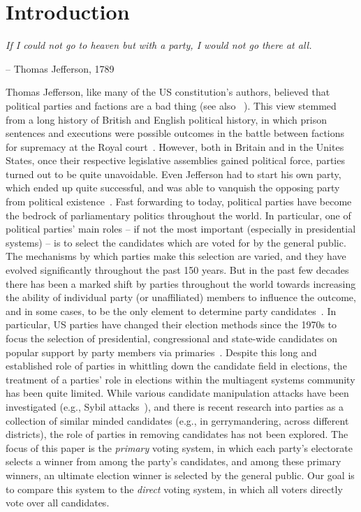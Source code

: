 \documentclass[letterpaper]{article} %
\newcommand{\citet}[1]{\citeauthor{#1}~\shortcite{#1}}
\theoremstyle{definition}
\begin{document}
\section{Introduction}
\epigraph{\emph{If I could not go to heaven but with a party, I would not go there at all.}}{-- Thomas Jefferson, 1789}
Thomas Jefferson, like many of the US constitution's authors, believed that political parties and factions are a bad thing (see also \citet{HMJ87}). This view stemmed from a long history of British and English political history, in which prison sentences and executions were possible outcomes in the battle between factions for supremacy at the Royal court~\cite{Sim07}. However, both in Britain and in the Unites States, once their respective legislative assemblies gained political force, parties turned out to be quite unavoidable. Even Jefferson had to start his own party, which ended up quite successful, and was able to vanquish the opposing party from political existence~\cite{Wil05}.
Fast forwarding to today, political parties have become the bedrock of parliamentary politics throughout the world. In particular, one of political parties' main roles -- if not the most important (especially in presidential systems) -- is to select the candidates which are voted for by the general public. The mechanisms by which parties make this selection are varied, and they have evolved significantly throughout the past 150 years. But in the past few decades there has been a marked shift by parties throughout the world towards increasing the ability of individual party (or unaffiliated) members to influence the outcome, and in some cases, to be the only element to determine party candidates~\cite{CB11}. In particular, US parties have changed their election methods since the 1970s to focus the selection of presidential, congressional and state-wide candidates on popular support by party members via primaries~\cite{CKNZ08}.
Despite this long and established role of parties in whittling down the candidate field in elections, the treatment of a parties' role in elections within the multiagent systems community has been quite limited. While various candidate manipulation attacks have been investigated (e.g., Sybil attacks~\cite{CM10}), and there is recent research into parties as a collection of similar minded candidates (e.g., in gerrymandering, across different districts), the role of parties in removing candidates has not been explored.
The focus of this paper is the \emph{primary} voting system, in which each party's electorate selects a winner from among the party's candidates, and among these primary winners, an ultimate election winner is selected by the general public. Our goal is to compare this system to the \emph{direct} voting system, in which all voters directly vote over all candidates.
\end{document}
